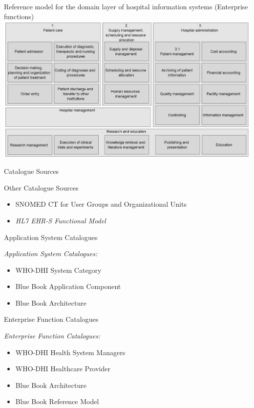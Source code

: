 \documentclass[aspectratio=1610,12pt]{beamer}
\begin{document}
\begin{frame}{Reference model for the domain layer of hospital information systems (Enterprise functions)}
  \centering
  \vspace{-0.3cm}
  \includegraphics[width=.95\textwidth]{img/rmdl.png}
\end{frame}

\begin{frame}{Catalogue Sources}
\begin{spacing}{1.5}
  Other Catalogue Sources
  \begin{itemize}
    \item SNOMED CT for User Groups and Organizational Units
    \item \emph{HL7 EHR-S Functional Model}
  \end{itemize}
\end{spacing}
\end{frame}

\begin{frame}{Application System Catalogues}
\begin{spacing}{1.5}
  \emph{Application System Catalogues:}
  \begin{itemize}
    \item WHO-DHI System Category
    \item Blue Book Application Component
    \item Blue Book Architecture
  \end{itemize}
\end{spacing}
\end{frame}

\begin{frame}{Enterprise Function Catalogues}
\begin{spacing}{1.5}
  \emph{Enterprise Function Catalogues:}
  \begin{itemize}
    \item WHO-DHI Health System Managers
    \item WHO-DHI Healthcare Provider
    \item Blue Book Architecture
    \item Blue Book Reference Model
  \end{itemize}
  \end{spacing}
\end{frame}
\end{document}
